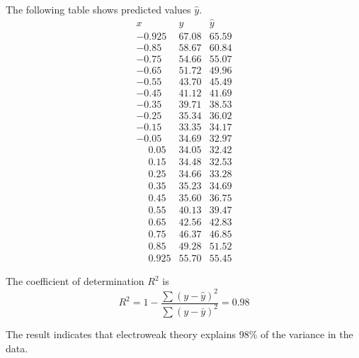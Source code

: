 The following table shows predicted values $\hat{y}$.
\begin{equation*}
\begin{matrix}
x & y & \hat y
\\[1ex]
-0.925 & 67.08 & 65.59\\
-0.85\phantom{0} & 58.67 & 60.84\\
-0.75\phantom{0} & 54.66 & 55.07\\
-0.65\phantom{0} & 51.72 & 49.96\\
-0.55\phantom{0} & 43.70 & 45.49\\
-0.45\phantom{0} & 41.12 & 41.69\\
-0.35\phantom{0} & 39.71 & 38.53\\
-0.25\phantom{0} & 35.34 & 36.02\\
-0.15\phantom{0} & 33.35 & 34.17\\
-0.05\phantom{0} & 34.69 & 32.97\\
\phantom{+}0.05\phantom{0} & 34.05 & 32.42\\
\phantom{+}0.15\phantom{0} & 34.48 & 32.53\\
\phantom{+}0.25\phantom{0} & 34.66 & 33.28\\
\phantom{+}0.35\phantom{0} & 35.23 & 34.69\\
\phantom{+}0.45\phantom{0} & 35.60 & 36.75\\
\phantom{+}0.55\phantom{0} & 40.13 & 39.47\\
\phantom{+}0.65\phantom{0} & 42.56 & 42.83\\
\phantom{+}0.75\phantom{0} & 46.37 & 46.85\\
\phantom{+}0.85\phantom{0} & 49.28 & 51.52\\
\phantom{+}0.925 & 55.70 & 55.45
\end{matrix}
\end{equation*}

The coefficient of determination $R^2$ is
\begin{equation*}
R^2=1-\frac{\sum(y-\hat{y})^2}{\sum(y-\bar{y})^2}=0.98
\end{equation*}

The result indicates that electroweak theory explains 98\% of the variance in the data.


